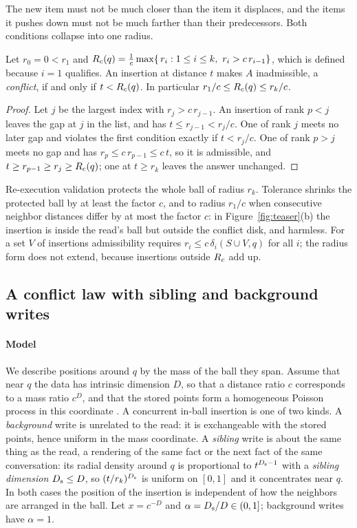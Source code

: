 \documentclass[sigconf, nonacm, review]{acmart}
\begin{document}
The new item must not be much closer than the item it displaces, and
the items it pushes down must not be much farther than their
predecessors. Both conditions collapse into one radius.

\begin{corollary}
\label{cor:radius}
Let $r_0=0<r_1$ and $\Rc(q)=\frac1c\max\{\,r_i : 1\le i\le k,\ r_i>c\,r_{i-1}\}$, which
is defined because $i=1$ qualifies. An insertion at distance $t$ makes
$A$ inadmissible, a \emph{conflict}, if and only if $t<R_c(q)$. In
particular $r_1/c\le R_c(q)\le r_k/c$.
\end{corollary}
\begin{proof}
Let $j$ be the largest index with $r_j>c\,r_{j-1}$. An insertion of
rank $p<j$ leaves the gap at $j$ in the list, and has
$t\le r_{j-1}<r_j/c$. One of rank $j$ meets no later gap and violates
the first condition exactly if $t<r_j/c$. One of rank $p>j$ meets no
gap and has $r_p\le c\,r_{p-1}\le c\,t$, so it is admissible, and
$t\ge r_{p-1}\ge r_j\ge R_c(q)$; one at $t\ge r_k$ leaves the answer unchanged.
\end{proof}

Re-execution validation protects the whole ball of radius $r_k$.
Tolerance shrinks the protected ball by at least the factor $c$, and to
radius $r_1/c$ when consecutive neighbor distances differ by at most
the factor $c$: in
Figure~\ref{fig:teaser}(b) the insertion is inside the read's ball
but outside the conflict disk, and harmless. For a set $V$ of insertions admissibility requires
$r_i\le c\,\delta_i(S\cup V,q)$ for all $i$; the radius form does not
extend, because insertions outside $R_c$ add up.

\subsection{A conflict law with sibling and background writes}
\label{sec:law}

\paragraph{Model}
We describe positions around $q$ by the mass of the ball they span.
Assume that near $q$ the data has intrinsic dimension $D$, so that a
distance ratio $c$ corresponds to a mass ratio $c^{D}$, and that the
stored points form a homogeneous Poisson process in this coordinate
\cite{DBLP:conf/nips/LevinaB04,DBLP:conf/kdd/AmsalegCFGHKN15,DBLP:conf/sisap/Houle17,DBLP:conf/stoc/KargerR02,DBLP:conf/icdt/BeyerGRS99}. A concurrent in-ball insertion is one of
two kinds.
A \emph{background} write is unrelated to the read: it is exchangeable
with the stored points, hence uniform in the mass coordinate. A
\emph{sibling} write is about the same thing as the read, a rendering
of the same fact or the next fact of the same conversation: its radial
density around $q$ is proportional to $t^{D_{\mathrm{s}}-1}$ with a \emph{sibling
dimension} $D_{\mathrm{s}}\le D$, so $(t/r_k)^{D_{\mathrm{s}}}$ is uniform on $[0,1]$ and it
concentrates near $q$. In both cases the position of the insertion is
independent of how the neighbors are arranged in the ball.
Let $x=c^{-D}$ and $\alpha=D_{\mathrm{s}}/D\in(0,1]$; background writes have $\alpha=1$.
\end{document}
